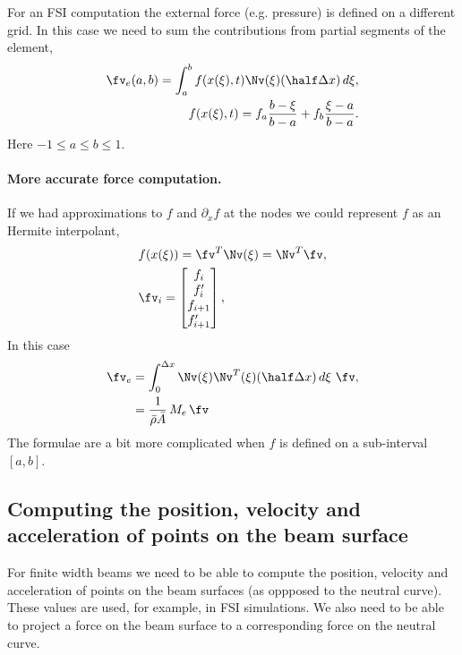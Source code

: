 \documentclass[11pt]{article}
\newcommand{\rhos}{\bar{\rho}}
\newcommand{\As}{\bar{A}}
\begin{document}
For an FSI computation the external force (e.g. pressure) is defined on a different grid. In this case we need
to sum the contributions from partial segments of the element,
\begin{align}
 \fv_e(a,b) = \int_a^{b} f(x(\xi),t) \Nv(\xi) (\half \dx) \, d\xi, \\
   f(x(\xi),t) = f_a\frac{b-\xi}{b-a}  + f_b \frac{\xi-a}{b-a} .
\end{align} 
Here $-1\le a \le b \le 1$. 

\paragraph{More accurate force computation.} If we had approximations to $f$ and $\partial_x f$ at the nodes we
could represent $f$ as an Hermite interpolant,
\begin{align}
&  f(x(\xi)) =  \fv^T \Nv(\xi) = \Nv^T\fv , \\
&  \fv_i = \begin{bmatrix} 
 f_i \\  f'_i \\ f_{i+1} \\ f'_{i+1}
              \end{bmatrix},
\end{align} 
In this case 
\begin{align}
 \fv_e &= \int_0^{\dx} \Nv(\xi) \Nv^T(\xi)  (\half \dx) \, d\xi ~\fv, \\
       &= \frac{1}{\rhos\As} \, M_e \, \fv
\end{align} 
The formulae are a bit more complicated when $f$ is defined on a sub-interval $[a,b]$. 

\subsection{Computing the position, velocity and acceleration of points on the beam surface}

For finite width beams we need to be able to compute the position, velocity and acceleration
of points on the beam surfaces (as oppposed to the neutral curve). These values are used, for example,
in FSI simulations.
We also need to be able to project a force on the beam surface to a corresponding force on the
neutral curve. 
\end{document}

